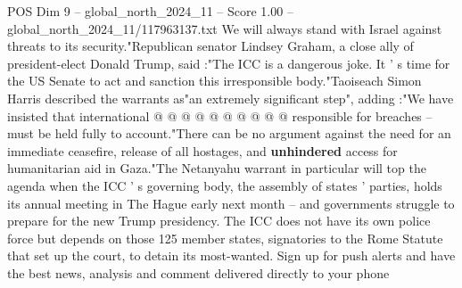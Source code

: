 \begin{textsample}{POS Dim 9 – global\_north\_2024\_11 – Score 1.00 – global\_north\_2024\_11/117963137.txt}
We will always stand with Israel against threats to its security."Republican senator Lindsey Graham, a close ally of president-elect Donald Trump, said :"The ICC is a dangerous joke.
It ' s time for the US Senate to act and sanction this irresponsible body."Taoiseach Simon Harris described the warrants as"an extremely significant step", adding :"We have insisted that international @ @ @ @ @ @ @ @ @ @ responsible for breaches -- must be held fully to account."There can be no argument against the need for an immediate ceasefire, release of all hostages, and \textbf{unhindered} access for humanitarian aid in Gaza."The Netanyahu warrant in particular will top the agenda when the ICC ' s governing body, the assembly of states ' parties, holds its annual meeting in The Hague early next month -- and governments struggle to prepare for the new Trump presidency.
The ICC does not have its own police force but depends on those 125 member states, signatories to the Rome Statute that set up the court, to detain its most-wanted.
Sign up for push alerts and have the best news, analysis and comment delivered directly to your phone

\end{textsample}
